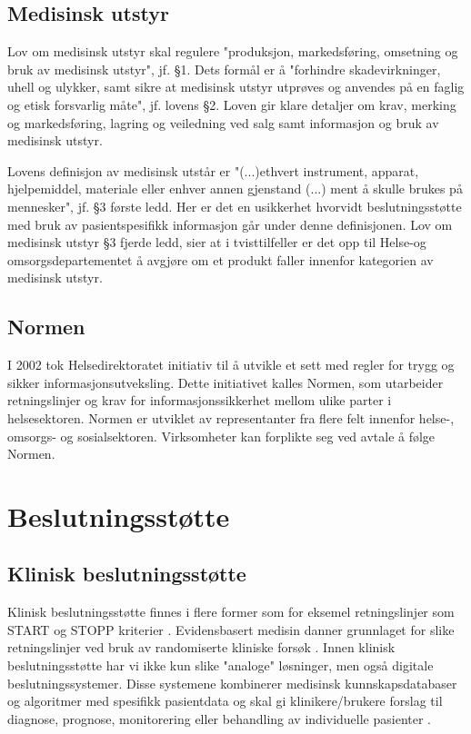 \subsection{Medisinsk utstyr}
Lov om medisinsk utstyr skal regulere "produksjon, markedsføring, omsetning og bruk av medisinsk utstyr", jf. §1. Dets formål er å "forhindre skadevirkninger, uhell og ulykker, samt sikre at medisinsk utstyr utprøves og anvendes på en faglig og etisk forsvarlig måte", jf. lovens §2. Loven gir klare detaljer om krav, merking og markedsføring, lagring og veiledning ved salg samt informasjon og bruk av medisinsk utstyr.

Lovens definisjon av medisinsk utstår er "(...)ethvert instrument, apparat, hjelpemiddel, materiale eller enhver annen gjenstand (...) ment å skulle brukes på mennesker", jf. §3 første ledd. Her er det en usikkerhet hvorvidt beslutningsstøtte med bruk av pasientspesifikk informasjon går under denne definisjonen. Lov om medisinsk utstyr §3 fjerde ledd, sier at i tvisttilfeller er det opp til Helse-og omsorgsdepartementet å avgjøre om et produkt faller innenfor kategorien av medisinsk utstyr.   

\subsection{Normen}
I 2002 tok Helsedirektoratet initiativ til å utvikle et sett med regler for trygg og sikker informasjonsutveksling. Dette initiativet kalles Normen, som utarbeider retningslinjer og krav for informasjonssikkerhet mellom ulike parter i helsesektoren. Normen er utviklet av representanter fra flere felt innenfor helse-, omsorgs- og sosialsektoren. Virksomheter kan forplikte seg ved avtale å følge Normen\citep{Normen}.

\section{Beslutningsstøtte}
\subsection{Klinisk beslutningsstøtte}
Klinisk beslutningsstøtte finnes i flere former som for eksemel retningslinjer som START og STOPP kriterier \citep{Bedre_legemiddelbehandling_av_eldre}. Evidensbasert medisin danner grunnlaget for slike retningslinjer ved bruk av randomiserte kliniske forsøk \citep{what_is_ebm}. Innen klinisk beslutningsstøtte har vi ikke kun slike "analoge" løsninger, men også digitale beslutningssystemer. Disse systemene kombinerer medisinsk kunnskapsdatabaser og algoritmer med spesifikk pasientdata og skal gi klinikere/brukere forslag til diagnose, prognose, monitorering eller behandling av individuelle pasienter \citep{european_commission}. 


